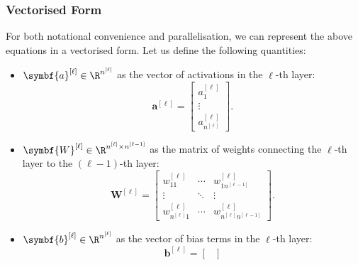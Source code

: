 \documentclass{article}
\begin{document}
\subsubsection{Vectorised Form}
For both notational convenience and parallelisation, we can represent
the above equations in a vectorised form. Let us define the following
quantities:
\begin{itemize}
    \item \(\symbf{a}^{\left[ \ell \right]} \in \R^{n^{\left[ \ell \right]}}\) as the vector of activations in the \(\ell\)-th layer:
          \begin{equation*}
              \symbf{a}^{\left[ \ell \right]} =
              \begin{bmatrix}
                  a_1^{\left[ \ell \right]} \\
                  \vdots                    \\
                  a_{n^{\left[ \ell \right]}}^{\left[ \ell \right]}
              \end{bmatrix}
              .
          \end{equation*}
    \item \(\symbf{W}^{\left[ \ell \right]} \in \R^{n^{\left[ \ell \right]} \times n^{\left[ \ell - 1 \right]}}\) as the matrix of weights connecting the \(\ell\)-th layer to the \(\left( \ell - 1 \right)\)-th layer:
          \begin{equation*}
              \symbf{W}^{\left[ \ell \right]} =
              \begin{bmatrix}
                  w_{11}^{\left[ \ell \right]}                        & \cdots & w_{1 n^{\left[ \ell - 1 \right]}}^{\left[ \ell \right]}                       \\
                  \vdots                                              & \ddots & \vdots                                                                        \\
                  w_{n^{\left[ \ell \right]} 1}^{\left[ \ell \right]} & \cdots & w_{n^{\left[ \ell \right]} n^{\left[ \ell - 1 \right]}}^{\left[ \ell \right]}
              \end{bmatrix}
              .
          \end{equation*}
    \item \(\symbf{b}^{\left[ \ell \right]} \in \R^{n^{\left[ \ell \right]}}\) as the vector of bias terms in the \(\ell\)-th layer:
          \begin{equation*}
              \symbf{b}^{\left[ \ell \right]} =
              \begin{bmatrix}

\end{bmatrix}
\end{equation*}
\end{itemize}
\end{document}
